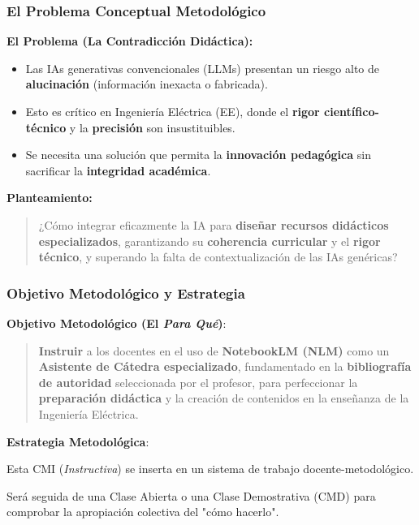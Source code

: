 \documentclass[aspectratio=43]{beamer}
\begin{document}
\begin{frame}
\frametitle{El Problema Conceptual Metodológico}

\textbf{El Problema (La Contradicción Didáctica):}
\begin{itemize}
    \item Las IAs generativas convencionales (LLMs) presentan un riesgo alto de \textbf{alucinación} (información inexacta o fabricada).
    \item Esto es crítico en Ingeniería Eléctrica (EE), donde el \textbf{rigor científico-técnico} y la \textbf{precisión} son insustituibles.
    \item Se necesita una solución que permita la \textbf{innovación pedagógica} sin sacrificar la \textbf{integridad académica}.
\end{itemize}

\vfill

\textbf{Planteamiento:}
\begin{quote}
¿Cómo integrar eficazmente la IA para \textbf{diseñar recursos didácticos especializados}, garantizando su \textbf{coherencia curricular} y el \textbf{rigor técnico}, y superando la falta de contextualización de las IAs genéricas?
\end{quote}
\end{frame}

\begin{frame}
\frametitle{Objetivo Metodológico y Estrategia}

\textbf{Objetivo Metodológico (El \textit{Para Qué})}:
\begin{quote}
\textbf{Instruir} a los docentes en el uso de \textbf{NotebookLM (NLM)} como un \textbf{Asistente de Cátedra especializado}, fundamentado en la \textbf{bibliografía de autoridad} seleccionada por el profesor, para perfeccionar la \textbf{preparación didáctica} y la creación de contenidos en la enseñanza de la Ingeniería Eléctrica.
\end{quote}
\vfill
\textbf{Estrategia Metodológica}:
\begin{itemize}
  {\small
    \item Esta CMI (\textit{Instructiva}) se inserta en un sistema de trabajo docente-metodológico.
    \item Será seguida de una Clase Abierta o una Clase Demostrativa (CMD) para comprobar la apropiación colectiva del "cómo hacerlo".
  }
  \end{itemize}
\end{frame}
\end{document}

